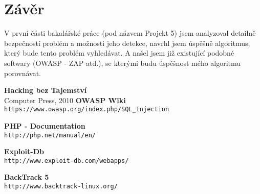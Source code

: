 \documentclass[12pt, a4paper]{report}
\begin{document}
\chapter{Závěr}
V první části bakalářské práce (pod názvem Projekt 5) jsem analyzoval detailně bezpečností problém a možnosti jeho detekce, navrhl jsem úspěšně algoritmus, který bude tento problém vyhledávat. A našel jsem již existující podobné softwary (OWASP - ZAP  atd.), se kterými budu úspěšnost mého algoritmu porovnávat.

\begin{thebibliography}{9}
               {\bf Hacking bez Tajemství} \\
           Computer Press, 2010
	{\bf OWASP Wiki} \\
	\texttt{https://www.owasp.org/index.php/SQL\_Injection}

	{\bf PHP - Documentation}\\
	\texttt{http://php.net/manual/en/}

	{\bf Exploit-Db}\\
	\texttt{http://www.exploit-db.com/webapps/}

 {\bf BackTrack 5}\\
	\texttt{http://www.backtrack-linux.org/}

\end{thebibliography}
\end{document}
